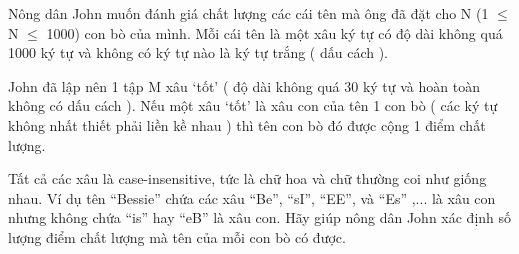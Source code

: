 Nông dân John muốn đánh giá chất lượng các cái tên mà ông đã đặt  cho N (1  $\le$  N  $\le$  1000) con bò của mình. Mỗi cái tên là một xâu ký tự  có độ dài không quá 1000 ký tự và không có ký tự nào là ký tự trắng ( dấu cách ).  

   John đã lập nên 1 tập M xâu ‘tốt’ ( độ dài không quá 30 ký tự và hoàn  toàn không có dấu cách ). Nếu một xâu ‘tốt’ là xâu con của tên 1 con  bò ( các ký tự không nhất thiết phải liền kề nhau ) thì tên con bò đó  được cộng 1 điểm chất lượng.  

   Tất cả các xâu là case-insensitive, tức là chữ hoa và chữ thường coi  như giống nhau. Ví dụ tên “Bessie” chứa các xâu “Be”, “sI”, “EE”,  và “Es” ,... là xâu con nhưng không chứa “is” hay “eB” là xâu  con. Hãy giúp nông dân John xác định số lượng điểm chất lượng mà  tên của mỗi con bò có được.  

\